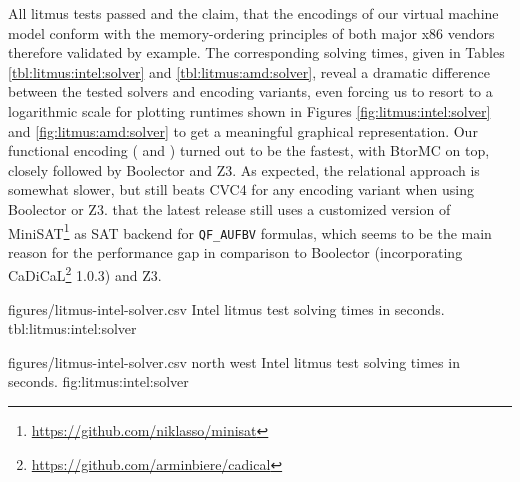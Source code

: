 All litmus tests passed and the claim, that the encodings of our virtual machine model conform with the memory-ordering principles of both major x86 vendors therefore validated by example.
The corresponding solving times, given in Tables \ref{tbl:litmus:intel:solver} and \ref{tbl:litmus:amd:solver}, reveal a dramatic difference
between the tested solvers and encoding variants,
even forcing us to resort to
a logarithmic scale for plotting runtimes  shown in Figures \ref{fig:litmus:intel:solver} and \ref{fig:litmus:amd:solver} to get a meaningful graphical representation.
Our functional encoding ({\BTOR} and {\SMTLIB}) turned out to be the fastest, with BtorMC on top, closely followed by Boolector and Z3.
As expected, the relational {\SMTLIB} approach is somewhat slower, but still beats CVC4 for any encoding variant when using Boolector or Z3.
that the latest release still uses a customized version of MiniSAT\footnote{\url{https://github.com/niklasso/minisat}} %
as SAT backend for \texttt{QF_AUFBV} formulas, which seems to be the main reason
for the performance gap
in comparison to Boolector (incorporating CaDiCaL\footnote{\url{https://github.com/arminbiere/cadical}} 1.0.3) and Z3.

\newpage

\SolverStatsTable
  {figures/litmus-intel-solver.csv}
  {\textnumero}
  {\IntelRowHeader}
  {Intel litmus test solving times in seconds.}
  {tbl:litmus:intel:solver}

\SolverStatsGraph
  {figures/litmus-intel-solver.csv}
  {north west}
  {Intel litmus test solving times in seconds.}
  {fig:litmus:intel:solver}

\newpage


